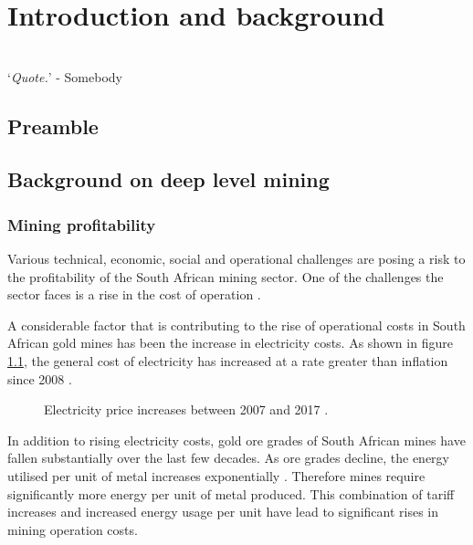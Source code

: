 \chapter{Introduction and background}  %
\vspace{38em}
\hrulefill
\\
\enquote*{\textit{Quote.}} - Somebody\\
\newpage
{} 
\setcounter{page}{2}

\section{Preamble}
\section{Background on deep level mining}
\subsection{Mining profitability}
 Various technical, economic, social and operational challenges are posing a risk to the profitability of the South African mining sector. One of the challenges the sector faces  is a rise in the cost of operation \cite{neingo2016trends}.\par
A considerable factor that is contributing to the rise of operational costs in South African gold mines has been the increase in electricity costs. As shown in figure \ref{fig: Eskom tariffs}, the general cost of electricity has increased at a rate greater than inflation since 2008 \cite{Eskom2013Tariffs}.
\begin{figure}[h]
	\centering
	\fbox{}
	\caption[Electricity price increases between 2007 and 2017.]{Electricity price increases between 2007 and 2017 \cite{Eskom2013Tariffs,Inflation2013}.}
	\label{fig: Eskom tariffs}
\end{figure}
\par
In addition to rising electricity costs, gold ore grades of South African mines have fallen substantially over the last few decades\cite{mudd2007global}. As ore grades decline, the energy utilised per unit of metal increases exponentially \cite{muller2010numerical}. Therefore mines require significantly more energy per unit of metal produced. This combination of tariff increases and increased energy usage per unit have lead to significant rises in mining operation costs.
